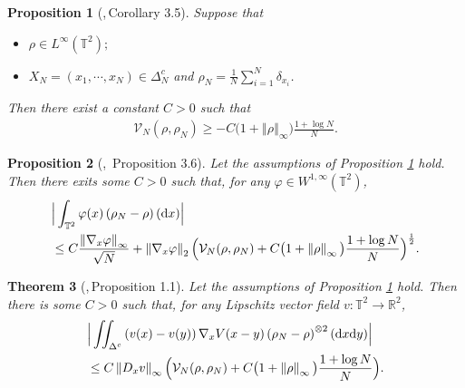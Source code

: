 \documentclass[11pt,reqno]{amsart}
\newtheorem{thm}{Theorem}[section]
\newtheorem{prop}[thm]{Proposition}
\numberwithin{equation}{section}
\def\dd{{\rm d}}
\begin{document}
\begin{prop}[\cite{duerinckx2020mean},\,Corollary 3.5]
Suppose that
\begin{itemize}
\item[{\rm(i)}]$\rho \in L^{\infty}(\mathbb{T}^{2});$ 
   \item[{\rm(ii)}]
   $X_{N}=(x_{1},\cdots\!,x_{N})\in \Delta_{N}^{c}$ and $\rho_{N}=\frac{1}{N}\sum_{i=1}^{N}\delta_{x_{i}}$. 
\end{itemize}
Then there exist a constant $C>0$ such that
\begin{align*}
\mathcal{V}_{N}(\rho,\rho_{N}) \geq -C\big(1+\left\Vert \rho \right\Vert_{\infty}\big)
\frac{1+\log N}{N}. 
\end{align*}
\label{non negativity}
\end{prop}
\begin{prop}[\cite{duerinckx2020mean},\, Proposition 3.6]
 Let the assumptions of {\rm Proposition \ref{non negativity}} hold. 
 Then there exits some $C>0$ such that, for any $\varphi\in W^{1,\infty}(\mathbb{T}^{2})$,
 \begin{align*}
&\Big|\int_{\mathbb{T}^{2}}\varphi(x)\left(\rho_{N}-\rho\right)(\dd x)\Big|\nonumber\\
&\leq C\frac{\left\Vert \nabla_{x} \varphi\right\Vert_{\infty}}{\sqrt{N}} +\left\Vert \nabla_{x} \varphi\right\Vert_{2} \Big(\mathcal{V}_{N}(\rho,\rho_{N})
+C\big(1+\left\Vert \rho \right\Vert_{\infty}\big)\frac{1+\log N}{N}\Big)^\frac{1}{2}.
 \end{align*}
 \label{coercivity inequality}
\end{prop}

\begin{thm}[\cite{duerinckx2020mean},\,Proposition 1.1]\label{commutator estimate} 
Let the assumptions of {\rm Proposition \ref{non negativity}} hold. 
Then there is some $C>0$ such that, for any Lipschitz vector field  $v:\mathbb{T}^{2}\rightarrow \mathbb{R}^{2}$,
 \begin{align*}
&\Big\vert \iint_{\Delta^{c}}\left(v(x)-v(y)\right)\nabla_{x} V(x-y)\left(\rho_{N}-\rho\right)^{\otimes2}(\dd x\dd y)\Big\vert\\
&\leq C\left\Vert D_{x} v\right\Vert_{\infty}
\Big(\mathcal{V}_{N}(\rho,\rho_{N})+C\big(1+\left\Vert \rho\right\Vert_{\infty}\big)\frac{1
+\log N}{N}\Big). 
\end{align*}   
\label{Commutator est}
\end{thm}
\end{document}
